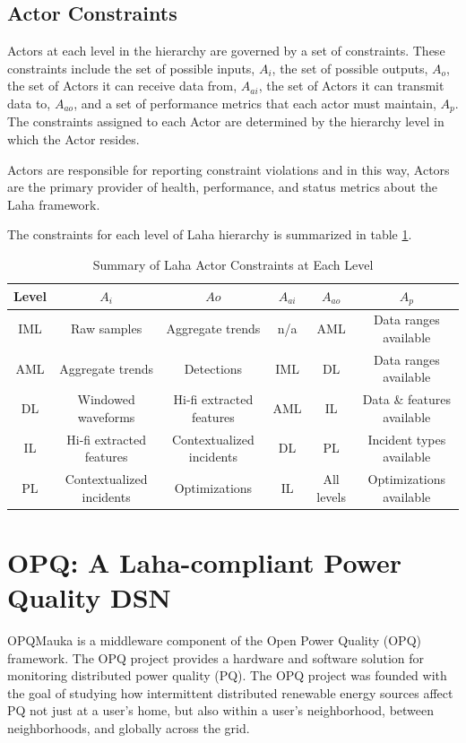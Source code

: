 \subsection{Actor Constraints}
Actors at each level in the hierarchy are governed by a set of constraints. These constraints include the set of possible inputs, $A_i$, the set of possible outputs, $A_o$, the set of Actors it can receive data from, $A_{ai}$, the set of Actors it can transmit data to, $A_{ao}$, and a set of performance metrics that each actor must maintain, $A_p$. The constraints assigned to each Actor are determined by the hierarchy level in which the Actor resides.  

Actors are responsible for reporting constraint violations and in this way, Actors are the primary provider of health, performance, and status metrics about the Laha framework.

The constraints for each level of Laha hierarchy is summarized in table \ref{actor-constraint-table}.

\begin{table}
	\centering
	\caption{Summary of Laha Actor Constraints at Each Level}
	\begin{tabular}{|c|c|c|c|c|c|}
		\hline
		Level & $A_i$ & $Ao$ & $A_{ai}$ & $A_{ao}$ & $A_p$ \\
		\hline
		IML & Raw samples & Aggregate trends & n/a & AML & Data ranges available \\
		\hline
		AML & Aggregate trends & Detections & IML & DL & Data ranges available \\
		\hline
		DL & Windowed waveforms & Hi-fi extracted features & AML & IL & Data \& features available \\
		\hline
		IL & Hi-fi extracted features & Contextualized incidents & DL & PL & Incident types available \\
		\hline
		PL & Contextualized incidents & Optimizations & IL & All levels & Optimizations available \\
		\hline
	\end{tabular}
	\label{actor-constraint-table}
\end{table}

\section{OPQ: A Laha-compliant Power Quality DSN}
OPQMauka is a middleware component of the Open Power Quality (OPQ) framework. The OPQ project provides a hardware and software solution for monitoring distributed power quality (PQ). The OPQ project was founded with the goal of studying how intermittent distributed renewable energy sources affect PQ not just at a user's home, but also within a user's neighborhood, between neighborhoods, and globally across the grid. 

